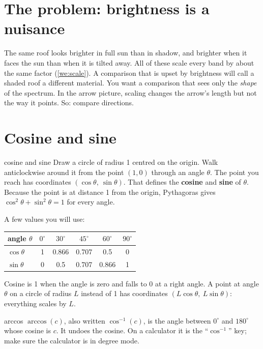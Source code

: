 \documentclass[11pt,a4paper,oneside,openany]{book}
\begin{document}
\section{The problem: brightness is a nuisance}

The same roof looks brighter in full sun than in shadow, and brighter when it faces the sun than when it is tilted away.
All of these scale every band by about the same factor (\cref{we:scale}). A comparison that is upset by brightness
will call a shaded roof a different material. You want a comparison that sees only the \emph{shape} of the spectrum. In
the arrow picture, scaling changes the arrow's length but not the way it points. So: compare directions.

\section{Cosine and sine}

\begin{defn}{cosine and sine}
Draw a circle of radius 1 centred on the origin. Walk anticlockwise around it from the point $(1,0)$ through an angle
$\theta$. The point you reach has coordinates $(\cos\theta,\ \sin\theta)$. That defines the \textbf{cosine} and
\textbf{sine} of $\theta$. Because the point is at distance 1 from the origin, Pythagoras gives
$\cos^2\theta+\sin^2\theta=1$ for every angle.
\end{defn}

A few values you will use:

\begin{center}
\begin{tabular}{@{}lccccc@{}}
\toprule
angle $\theta$ & $0^\circ$ & $30^\circ$ & $45^\circ$ & $60^\circ$ & $90^\circ$\\
\midrule
$\cos\theta$ & 1 & 0.866 & 0.707 & 0.5 & 0\\
$\sin\theta$ & 0 & 0.5 & 0.707 & 0.866 & 1\\
\bottomrule
\end{tabular}
\end{center}

Cosine is 1 when the angle is zero and falls to 0 at a right angle. A point at angle $\theta$ on a circle of radius $L$
instead of 1 has coordinates $(L\cos\theta,\ L\sin\theta)$: everything scales by $L$.

\begin{defn}{arccos}
$\arccos(c)$, also written $\cos^{-1}(c)$, is the angle between $0^\circ$ and $180^\circ$ whose cosine is $c$. It undoes the
cosine. On a calculator it is the ``$\cos^{-1}$'' key; make sure the calculator is in degree mode.
\end{defn}
\end{document}
